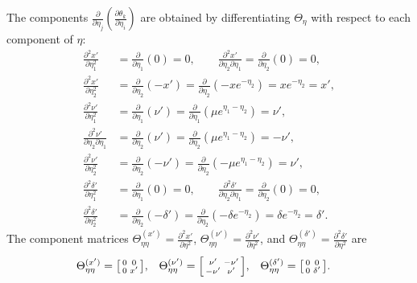 \documentclass{article}
\begin{document}
The components $\frac{\partial}{\partial \eta_j} \left( \frac{\partial \theta_k}{\partial \eta_i} \right)$ are obtained by differentiating $\Theta_\eta$ with respect to each component of $\eta$:
%
\begin{align}
  \frac{\partial^2 x'}{\partial \eta_1^2}                 & = \frac{\partial}{\partial \eta_1}(0)   = 0, \qquad \frac{\partial^2 x'}{\partial \eta_2 \partial \eta_1} = \frac{\partial}{\partial \eta_2}(0) = 0,    \\
  \frac{\partial^2 x'}{\partial \eta_2^2}                 & = \frac{\partial}{\partial \eta_2}(-x') = \frac{\partial}{\partial \eta_2}(-x e^{-\eta_2}) = x e^{-\eta_2} = x',                                        \\
  \frac{\partial^2 \nu'}{\partial \eta_1^2}               & = \frac{\partial}{\partial \eta_1}(\nu') = \frac{\partial}{\partial \eta_1}(\mu e^{\eta_1 - \eta_2}) = \nu',                                            \\
  \frac{\partial^2 \nu'}{\partial \eta_2 \partial \eta_1} & = \frac{\partial}{\partial \eta_2}(\nu') = \frac{\partial}{\partial \eta_2}(\mu e^{\eta_1 - \eta_2}) = -\nu',                                           \\
  \frac{\partial^2 \nu'}{\partial \eta_2^2}               & = \frac{\partial}{\partial \eta_2}(-\nu') = \frac{\partial}{\partial \eta_2}(-\mu e^{\eta_1 - \eta_2}) = \nu',                                          \\
  \frac{\partial^2 \delta'}{\partial \eta_1^2}            & = \frac{\partial}{\partial \eta_1}(0) = 0, \qquad \frac{\partial^2 \delta'}{\partial \eta_2 \partial \eta_1} = \frac{\partial}{\partial \eta_2}(0) = 0, \\
  \frac{\partial^2 \delta'}{\partial \eta_2^2}            & = \frac{\partial}{\partial \eta_2}(-\delta') = \frac{\partial}{\partial \eta_2}(-\delta e^{-\eta_2}) = \delta e^{-\eta_2} = \delta'.
\end{align}
%
The component matrices $\Theta_{\eta\eta}^{(x')} = \frac{\partial^2 x'}{\partial \eta^2}$, $\Theta_{\eta\eta}^{(\nu')} = \frac{\partial^2 \nu'}{\partial \eta^2}$, and $\Theta_{\eta\eta}^{(\delta')} = \frac{\partial^2 \delta'}{\partial \eta^2}$ are
%
\begin{align}
  \Theta_{\eta\eta}^{(x')}      & = \begin{bsmallmatrix} 0 & 0 \\ 0 & x' \end{bsmallmatrix}, &
  \Theta_{\eta\eta}^{(\nu')}    & = \begin{bsmallmatrix} \nu' & -\nu' \\ -\nu' & \nu' \end{bsmallmatrix}, &
  \Theta_{\eta\eta}^{(\delta')} & = \begin{bsmallmatrix} 0 & 0 \\ 0 & \delta' \end{bsmallmatrix}.
\end{align}
\end{document}
